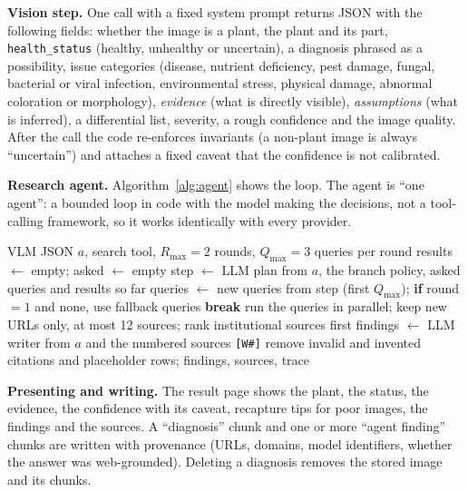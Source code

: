 \noindent\textbf{Vision step.} One call with a fixed system prompt returns JSON with the following fields: whether the image is a plant,
the plant and its part, \texttt{health\_status} (healthy, unhealthy or uncertain), a diagnosis phrased as a possibility, issue
categories (disease, nutrient deficiency, pest damage, fungal, bacterial or viral infection, environmental stress, physical damage,
abnormal coloration or morphology), \emph{evidence} (what is directly visible), \emph{assumptions} (what is inferred), a
differential list, severity, a rough confidence and the image quality. After the call the code re-enforces invariants (a
non-plant image is always ``uncertain'') and attaches a fixed caveat that the confidence is not calibrated.

\noindent\textbf{Research agent.} Algorithm~\ref{alg:agent} shows the loop. The agent is ``one agent'': a bounded loop in code with
the model making the decisions, not a tool-calling framework, so it works identically with every provider.

\begin{algorithm}[H]
\caption{Research agent for a diagnosis}
\label{alg:agent}
\begin{algorithmic}[1]
\Require VLM JSON $a$, search tool, $R_{\max}=2$ rounds, $Q_{\max}=3$ queries per round
\State results $\gets$ empty; asked $\gets$ empty
  \State step $\gets$ LLM plan from $a$, the branch policy, asked queries and results so far
  \State queries $\gets$ new queries from step (first $Q_{\max}$); \textbf{if} round $=1$ and none, use fallback queries
   \State \textbf{break} \EndIf
  \State run the queries in parallel; keep new URLs only, at most 12 sources; rank institutional sources first
\EndFor
\State findings $\gets$ LLM writer from $a$ and the numbered sources \texttt{[W\#]}
\State remove invalid and invented citations and placeholder rows; \Return findings, sources, trace
\end{algorithmic}
\end{algorithm}

\noindent\textbf{Presenting and writing.} The result page shows the plant, the status, the evidence, the confidence with its caveat,
recapture tips for poor images, the findings and the sources. A ``diagnosis'' chunk and one or more ``agent finding'' chunks are
written with provenance (URLs, domains, model identifiers, whether the answer was web-grounded). Deleting a diagnosis removes
the stored image and its chunks.

